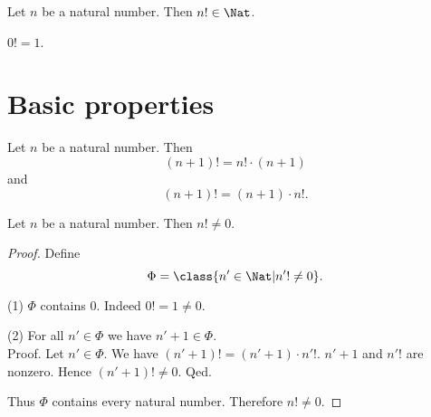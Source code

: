 \documentclass[../arithmetic.tex]{subfiles}
\begin{document}
  \begin{forthel}
    \begin{lemma}
      Let $n$ be a natural number.
      Then $n! \in \Nat$.
    \end{lemma}
  \end{forthel}

  \begin{forthel}
    \begin{lemma}
      $0! = 1$.
    \end{lemma}
  \end{forthel}


  \section{Basic properties}

  \begin{forthel}
    \begin{lemma}
      Let $n$ be a natural number.
      Then \[ (n + 1)! = n! \cdot (n + 1) \]
      and \[ (n + 1)! = (n + 1) \cdot n!. \]
    \end{lemma}
  \end{forthel}

  \begin{forthel}
    \begin{proposition}
      Let $n$ be a natural number.
      Then $n! \neq 0$.
    \end{proposition}
    \begin{proof}
      Define \[ \Phi = \class{n' \in \Nat | n'! \neq 0}. \]

      (1) $\Phi$ contains $0$.
      Indeed $0! = 1 \neq 0$.

      (2) For all $n' \in \Phi$ we have $n' + 1 \in \Phi$. \\
      Proof.
        Let $n' \in \Phi$.
        We have $(n' + 1)! = (n' + 1) \cdot n'!$.
        $n' + 1$ and $n'!$ are nonzero.
        Hence $(n' + 1)! \neq 0$.
      Qed.

      Thus $\Phi$ contains every natural number.
      Therefore $n! \neq 0$.
    \end{proof}
  \end{forthel}  
\end{document}

